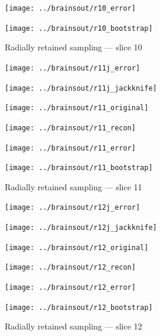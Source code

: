 \documentclass[article]{jdssv}
\begin{document}
\begin{appendix}
\begin{figure}
\begin{centering}
\parbox{\imsize}{\texttt{[image: ../brainsout/r10\_error]}}
\parbox{\imsize}{\texttt{[image: ../brainsout/r10\_bootstrap]}}

\end{centering}
\caption{Radially retained sampling --- slice 10}
\end{figure}


\begin{figure}
\begin{centering}

\parbox{\imsize}{\texttt{[image: ../brainsout/r11j\_error]}}
\parbox{\imsize}{\texttt{[image: ../brainsout/r11j\_jackknife]}}

\vspace{\vertsep}

\parbox{\imsize}{\texttt{[image: ../brainsout/r11\_original]}}
\parbox{\imsize}{\texttt{[image: ../brainsout/r11\_recon]}}

\vspace{\vertsep}

\parbox{\imsize}{\texttt{[image: ../brainsout/r11\_error]}}
\parbox{\imsize}{\texttt{[image: ../brainsout/r11\_bootstrap]}}

\end{centering}
\caption{Radially retained sampling --- slice 11}
\end{figure}


\begin{figure}
\begin{centering}

\parbox{\imsize}{\texttt{[image: ../brainsout/r12j\_error]}}
\parbox{\imsize}{\texttt{[image: ../brainsout/r12j\_jackknife]}}

\vspace{\vertsep}

\parbox{\imsize}{\texttt{[image: ../brainsout/r12\_original]}}
\parbox{\imsize}{\texttt{[image: ../brainsout/r12\_recon]}}

\vspace{\vertsep}

\parbox{\imsize}{\texttt{[image: ../brainsout/r12\_error]}}
\parbox{\imsize}{\texttt{[image: ../brainsout/r12\_bootstrap]}}

\end{centering}
\caption{Radially retained sampling --- slice 12}
\end{figure}


\begin{figure}
\begin{centering}


\end{centering}
\end{figure}
\end{appendix}
\end{document}
